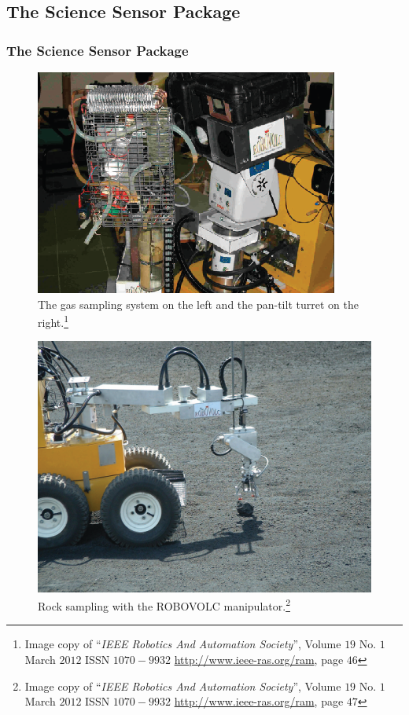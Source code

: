 \documentclass[xcolor=svgnames]{beamer}
\begin{document}
\subsection{The Science Sensor Package}
\begin{frame}
 \frametitle{The Science Sensor Package}
\begin{figure}[H]
	\centering
      \includegraphics[scale=0.58]{9.png}
	\caption{\scriptsize The gas sampling system on the left and the pan-tilt turret on the right.\footnote{Image copy of ``\textit{IEEE Robotics And Automation Society}'', Volume $19$ No. $1$ March $2012$ ISSN $1070-9932$ \url{http://www.ieee-ras.org/ram}, page $46$}}
      \label{fig25}
    \end{figure}
\end{frame}

\begin{frame}
\begin{figure}[H]
	\centering
      \includegraphics[scale=0.45]{10.png}
	\caption{Rock sampling with the ROBOVOLC manipulator.\footnote{Image copy of ``\textit{IEEE Robotics And Automation Society}'', Volume $19$ No. $1$ March $2012$ ISSN $1070-9932$ \url{http://www.ieee-ras.org/ram}, page $47$}}
      \label{fig25}
    \end{figure}
\end{frame}
\end{document}
